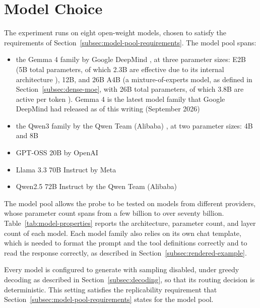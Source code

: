 \section{Model Choice}
\label{sec:model-choice}

The experiment runs on eight open-weight models, chosen to satisfy the requirements of Section~\ref{subsec:model-pool-requirements}. The model pool spans:

\begin{itemize}
    \item the Gemma 4 family by Google DeepMind \cite{teamGemma4Technical2026}, at three parameter sizes: E2B (5B total parameters, of which 2.3B are effective due to its internal architecture \cite{teamGemma4Technical2026}), 12B, and 26B A4B (a mixture-of-experts model, as defined in Section~\ref{subsec:dense-moe}, with 26B total parameters, of which 3.8B are active per token \cite{teamGemma4Technical2026}). Gemma 4 is the latest model family that Google DeepMind had released as of this writing (September 2026)
    \item the Qwen3 family by the Qwen Team (Alibaba) \cite{yangQwen3TechnicalReport2025}, at two parameter sizes: 4B and 8B
    \item GPT-OSS 20B by OpenAI \cite{openaiGptoss120bGptoss20bModel2025}
    \item Llama 3.3 70B Instruct by Meta \cite{MetallamaLlama3370BInstructHugging2024}
    \item Qwen2.5 72B Instruct by the Qwen Team (Alibaba) \cite{qwenQwen25TechnicalReport2025}
\end{itemize}

The model pool allows the probe to be tested on models from different providers, whose parameter count spans from a few billion to over seventy billion. Table~\ref{tab:model-properties} reports the architecture, parameter count, and layer count of each model. Each model family also relies on its own chat template, which is needed to format the prompt and the tool definitions correctly and to read the response correctly, as described in Section~\ref{subsec:rendered-example}.

Every model is configured to generate with sampling disabled, under greedy decoding as described in Section~\ref{subsec:decoding}, so that its routing decision is deterministic. This setting satisfies the replicability requirement that Section~\ref{subsec:model-pool-requirements} states for the model pool.

